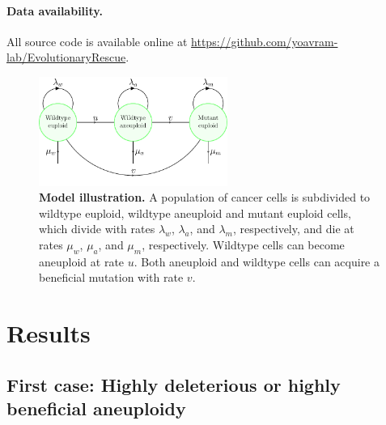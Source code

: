 \documentclass[12pt]{extarticle}
\begin{document}
\paragraph{Data availability.} All source code is available online at \url{https://github.com/yoavram-lab/EvolutionaryRescue}.



\begin{figure}
\centering
\includegraphics[width=0.55\textwidth]{Figures/figureAneuploidy3.pdf}


\caption{\textbf{Model illustration.}
A population of cancer cells is subdivided to wildtype euploid, wildtype aneuploid and mutant euploid cells, which divide with rates $\lambda_w$, $\lambda_a$, and $\lambda_m$, respectively, and die at rates $\mu_w$, $\mu_a$, and $\mu_m$, respectively. 
Wildtype cells can become aneuploid at rate $u$. Both aneuploid and wildtype cells can acquire a beneficial mutation with rate $v$.}
\label{figureAneuploidy}
\end{figure}


\section*{Results}


\subsection*{First case: Highly deleterious or highly beneficial aneuploidy}
\end{document}
